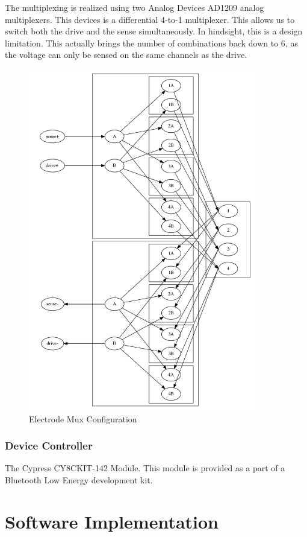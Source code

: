 \documentclass[]{IEEEtran}
\begin{document}
The multiplexing is realized using two Analog Devices AD1209 analog multiplexers. This devices is a differential 4-to-1 multiplexer. This allows us to switch both the drive and the sense simultaneously. In hindsight, this is a design limitation. This actually brings the number of combinations back down to 6, as the voltage can only be sensed on the same channels as the drive.


\begin{figure} %
\centering
\includegraphics[width=10cm ]{./graphics/mux.png}
\centering
\caption{Electrode Mux Configuration}
\label{fig:mux}
\end{figure}


\subsubsection{Device Controller}
The Cypress CY8CKIT-142 Module. This module is provided as a part of a Bluetooth Low Energy development kit.

\section{Software Implementation}
\end{document}
